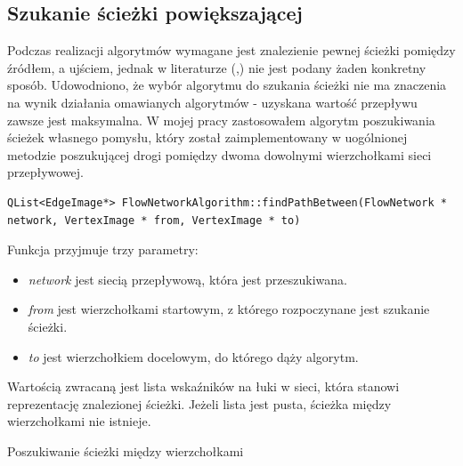 \subsection{Szukanie ścieżki powiększającej}\label{ssec:szukanieSciezkiAlg}
Podczas realizacji algorytmów wymagane jest znalezienie pewnej ścieżki pomiędzy źródłem, a ujściem, jednak w literaturze (\cite{id:ZaawansowaneAlgorytmySiecPrzeplyw},\cite{id:IntroductionToAlgorithmsFordFulkerson}) nie jest podany żaden konkretny sposób. Udowodniono, że wybór algorytmu do szukania ścieżki nie ma znaczenia na wynik działania omawianych algorytmów - uzyskana wartość przepływu zawsze jest maksymalna. W mojej pracy zastosowałem algorytm poszukiwania ścieżek własnego pomysłu, który został zaimplementowany w uogólnionej metodzie poszukującej drogi pomiędzy dwoma dowolnymi wierzchołkami sieci przepływowej.
\begin{verbatim}
QList<EdgeImage*> FlowNetworkAlgorithm::findPathBetween(FlowNetwork * network, VertexImage * from, VertexImage * to)
\end{verbatim}
Funkcja przyjmuje trzy parametry:
\begin{itemize}
	\item \emph{network} jest siecią przepływową, która jest przeszukiwana.
	\item \emph{from} jest wierzchołkami startowym, z którego rozpoczynane jest szukanie ścieżki.
	\item \emph{to} jest wierzchołkiem docelowym, do którego dąży algorytm.
\end{itemize}
Wartością zwracaną jest lista wskaźników na łuki w sieci, która stanowi reprezentację znalezionej ścieżki. Jeżeli lista jest pusta, ścieżka między wierzchołkami nie istnieje.
\begin{algorithm}[H]
	\caption{Poszukiwanie ścieżki między wierzchołkami}\label{poszukiwanieSciezkiMiedzyWierzcholkami}
	\begin{algorithmic}
					\EndIf
				\EndFor
					\Else
						\Else
						\EndIf
					\EndIf
				\EndIf
				\EndIf
			\EndWhile\space
		\EndProcedure
	\end{algorithmic}
\end{algorithm}
